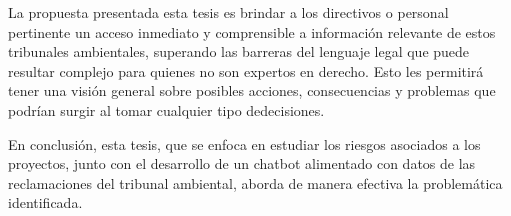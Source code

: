 \par La propuesta presentada esta tesis es brindar a los directivos o personal pertinente un acceso inmediato y comprensible a información relevante de estos tribunales ambientales, superando las 
barreras del lenguaje legal que puede resultar complejo para quienes no son expertos en derecho. Esto les permitirá tener una visión general sobre posibles acciones, consecuencias y problemas que 
podrían surgir al tomar cualquier tipo  dedecisiones.

\par En conclusión, esta tesis, que se enfoca en estudiar los riesgos asociados a los proyectos, junto con el desarrollo de un chatbot alimentado con datos de las reclamaciones del tribunal 
ambiental, aborda de manera efectiva la problemática identificada.


